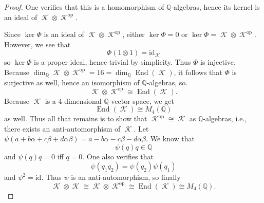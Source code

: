 \documentclass{article}
\theoremstyle{customplain}
\theoremstyle{customdef}
\newcommand{\Q}{\mathbb{Q}}
\newcommand{\id}{\mathrm{id}}
\DeclareMathOperator{\op}{\mathrm{op}}
\DeclareMathOperator{\End}{\mathrm{End}}
\DeclareMathOperator{\calK}{\mathcal{K}}
\theoremstyle{definition} %
\begin{document}
\begin{proof}
    One verifies that this is a homomorphism of $\Q$-algebras, hence its kernel is an ideal of $\calK \otimes \calK^{\op}.$

    
    Since $\ker \Phi$ is an ideal of $\calK \otimes \calK^{\op}$, either $\ker \Phi = 0$ or $\ker \Phi = \calK \otimes \calK^{\op}.$ However, we see that
    \[
    \Phi(1\otimes 1) = \id_{\calK}
    \]
    so $\ker \Phi $ is a proper ideal, hence trivial by simplicity. Thus $\Phi$ is injective. Because $\dim_\Q \calK \otimes \calK^{\op}=16=\dim_\Q \End(\calK)$, it follows that $\Phi$ is surjective as well, hence an isomorphism of $\Q$-algebras, so.
    \[
    \calK \otimes \calK^{\op} \cong \End(\calK).
    \]
    Because $\calK$ is a 4-dimensional $\Q$-vector space, we get 
    \[
    \End(\calK)\cong M_4(\Q)
    \]
    as well. Thus all that remains is to show that $\calK^{\op} \cong \calK$ as $\Q$-algebras, i.e., there exists an anti-automorphism of $\calK$. Let $\psi(a+b\alpha+c\beta+d\alpha\beta)=a-b\alpha-c\beta-d\alpha\beta$. We know that
    \[
    \psi(q)q \in \Q
    \]
    and $\psi(q)q = 0$ iff $q=0.$ One also verifies that
    \[
    \psi(q_1 q_2)=\psi(q_2)\psi(q_1)
    \]
    and $\psi^2 = \id.$ Thus $\psi$ is an anti-automorphism, so finally
    \[
    \calK \otimes \calK \cong \calK \otimes \calK^{\op} \cong \End(\calK) \cong M_4(\Q).
    \]
\end{proof}
\end{document}
